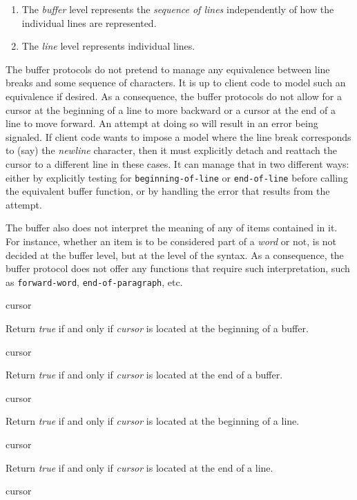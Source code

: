 \begin{enumerate}
\item The \emph{buffer} level represents the \emph{sequence of lines}
  independently of how the individual lines are represented.  
\item The \emph{line} level represents individual lines. 
\end{enumerate}

The buffer protocols do not pretend to manage any equivalence between
line breaks and some sequence of characters.  It is up to client code
to model such an equivalence if desired.  As a consequence, the buffer
protocols do not allow for a cursor at the beginning of a line to
more backward or a cursor at the end of a line to move forward.  An
attempt at doing so will result in an error being signaled.  If client
code wants to impose a model where the line break corresponds to (say)
the \emph{newline} character, then it must explicitly detach and
reattach the cursor to a different line in these cases.  It can manage
that in two different ways: either by explicitly testing for
\texttt{beginning-of-line} or \texttt{end-of-line} before calling the
equivalent buffer function, or by handling the error that results from
the attempt. 

The buffer also does not interpret the meaning of any of items
contained in it.  For instance, whether an item is to be considered
part of a \emph{word} or not, is not decided at the buffer level, but
at the level of the syntax.  As a consequence, the buffer protocol
does not offer any functions that require such interpretation, such as
\texttt{forward-word}, \texttt{end-of-paragraph}, etc. 

 {cursor}

Return \textit{true} if and only if \textit{cursor} is located at the
beginning of a buffer.

 {cursor}

Return \textit{true} if and only if \textit{cursor} is located at the
end of a buffer.

 {cursor}

Return \textit{true} if and only if \textit{cursor} is located at the
beginning of a line.

 {cursor}

Return \textit{true} if and only if \textit{cursor} is located at the
end of a line.

 {cursor}

